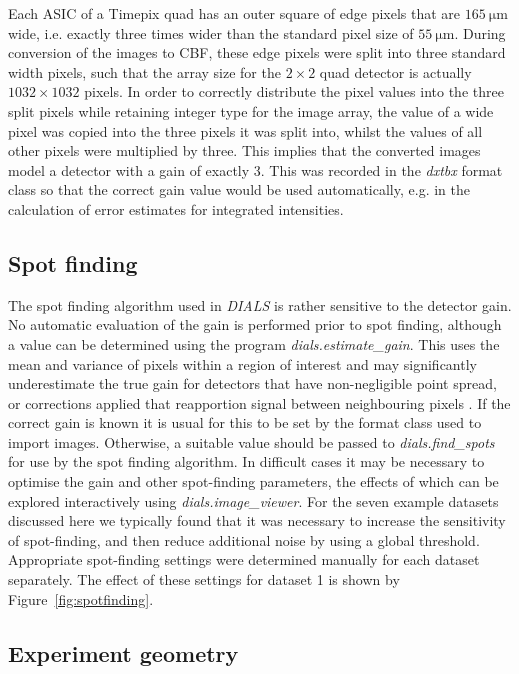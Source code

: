 \documentclass[preprint]{iucr}
\newcommand{\dxtbx}{\emph{dxtbx}\xspace}
\newcommand{\dials}{\emph{DIALS}\xspace}
\newcommand{\dialsestimategain}{\emph{dials.estimate\_gain}\xspace}
\newcommand{\dialsfindspots}{\emph{dials.find\_spots}\xspace}
\newcommand{\dialsimageviewer}{\emph{dials.image\_viewer}\xspace}
\begin{document}
Each ASIC of a Timepix quad has an outer square of edge pixels that are
$\SI{165}{\micro\metre}$ wide, i.e. exactly three times wider than the standard
pixel size of $\SI{55}{\micro\metre}$. During conversion of the images to CBF,
these edge pixels were split into three standard width pixels, such that the
array size for the $2\times2$ quad detector is actually $1032\times1032$
pixels. In order to correctly distribute the pixel values into the three split
pixels while retaining integer type for the image array, the value of a wide
pixel was copied into the three pixels it was split into, whilst the values of
all other pixels were multiplied by three. This implies that the converted
images model a detector with a gain of exactly 3. This was recorded in the
\dxtbx format class so that the correct gain value would be used automatically,
e.g. in the calculation of error estimates for integrated intensities.

\subsection{Spot finding \label{sec:spot_finding}}

The spot finding algorithm used in \dials is rather sensitive to the detector
gain. No automatic evaluation of the gain is performed prior to spot finding,
although a value can be determined using the program \dialsestimategain. This
uses the mean and variance of pixels within a region of interest
\cite{leslie2006integration} and may significantly underestimate the true gain
for detectors that have non-negligible point spread, or corrections applied
that reapportion signal between neighbouring pixels \cite{Waterman2010}. If the
correct gain is known it is usual for this to be set by the format class used
to import images. Otherwise, a suitable value should be passed to
\dialsfindspots for use by the spot finding algorithm. In difficult cases it
may be necessary to optimise the gain and other spot-finding parameters, the
effects of which can be explored interactively using \dialsimageviewer. For the
seven example datasets discussed here we typically found that it was necessary
to increase the sensitivity of spot-finding, and then reduce additional noise
by using a global threshold. Appropriate spot-finding settings were determined
manually for each dataset separately. The effect of these settings for dataset
1 is shown by Figure~\ref{fig:spotfinding}.

\subsection{Experiment geometry}
\end{document}
